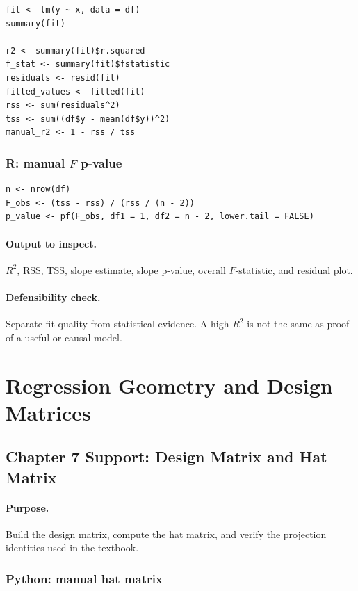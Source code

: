 \begin{verbatim}
fit <- lm(y ~ x, data = df)
summary(fit)

r2 <- summary(fit)$r.squared
f_stat <- summary(fit)$fstatistic
residuals <- resid(fit)
fitted_values <- fitted(fit)
rss <- sum(residuals^2)
tss <- sum((df$y - mean(df$y))^2)
manual_r2 <- 1 - rss / tss
\end{verbatim}

\subsubsection*{R: manual \(F\) p-value}

\begin{verbatim}
n <- nrow(df)
F_obs <- (tss - rss) / (rss / (n - 2))
p_value <- pf(F_obs, df1 = 1, df2 = n - 2, lower.tail = FALSE)
\end{verbatim}

\paragraph{Output to inspect.} \(R^2\), RSS, TSS, slope estimate, slope p-value, overall \(F\)-statistic, and residual plot.

\paragraph{Defensibility check.} Separate fit quality from statistical evidence.  A high \(R^2\) is not the same as proof of a useful or causal model.

\section{Regression Geometry and Design Matrices}
\label{app:cookbook-regression-geometry}

\subsection{Chapter 7 Support: Design Matrix and Hat Matrix}
\label{app:ch07-software-cookbook-design-matrix-and-hat-matrix}

\paragraph{Purpose.} Build the design matrix, compute the hat matrix, and verify the projection identities used in the textbook.

\subsubsection*{Python: manual hat matrix}

